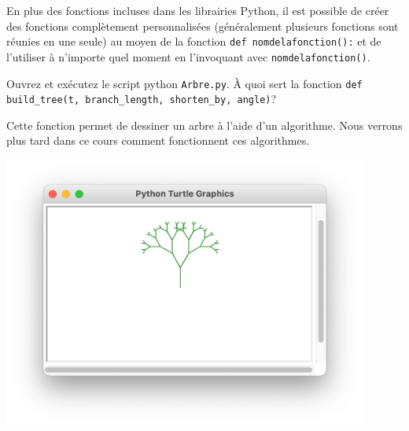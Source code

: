 En plus des fonctions incluses dans les librairies Python, il est possible de créer des fonctions complètement personnalisées (généralement plusieurs fonctions sont réunies en une seule) au moyen de la fonction \lstinline{def nomdelafonction():} et de l'utiliser à n'importe quel moment en l'invoquant avec \lstinline{nomdelafonction()}.
\\
\begin{Exercice}[5 minutes]

Ouvrez et exécutez le script python \lstinline{Arbre.py}. À quoi sert la fonction \lstinline{def build_tree(t, branch_length, shorten_by, angle)}?

\begin{solution}

Cette fonction permet de dessiner un arbre à l'aide d'un algorithme. Nous verrons plus tard dans ce cours comment fonctionnent ces algorithmes.

\begin{center}
\includegraphics[width=12cm]{arbre.png}		
\end{center}

\end{solution}
\end{Exercice}

